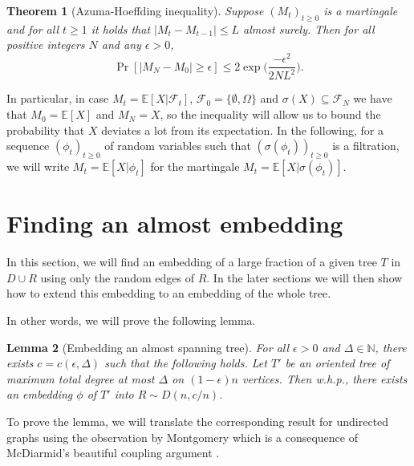 \documentclass[10pt, a4paper]{article}
\newtheorem{theorem}{Theorem}
\newtheorem{lemma}[theorem]{Lemma}
\theoremstyle{remark}
\newcommand*{\E}{\ensuremath{\mathbb{E}}}
\begin{document}
\vspace{10px}
\begin{theorem}[Azuma-Hoeffding inequality]\cite{azuma, hoeffding}\label{thm:azuma}
        Suppose $(M_t)_{t\geq 0}$ is a martingale and for all $t\geq 1$ it holds that $|M_t - M_{t-1}| \leq L$ almost surely.
        Then for all positive integers $N$ and any $\epsilon > 0$,
        \[ \Pr[|M_N - M_0| \geq \epsilon] \leq 2\exp \Bigg(\frac{-\epsilon^2}{2NL^2} \Bigg). \]
\end{theorem}

In particular, in case $M_t = \E[X | \mathcal{F}_t]$, $\mathcal{F}_0 = \{ \emptyset, \Omega \}$ and $\sigma(X) \subseteq \mathcal{F}_N$ we have that $M_0 = \E[X]$ and $M_N = X$, so the inequality will allow us to bound the probability that $X$ deviates a lot from its expectation.
In the following, for a sequence $(\phi_t)_{t\geq 0}$ of random variables such that $(\sigma(\phi_t))_{t\geq 0}$ is a filtration, we will write $M_t = \E[X | \phi_t]$ for the martingale $M_t = \E[X | \sigma(\phi_t)]$.

\section{Finding an almost embedding}\label{section:almostembedding}

In this section, we will find an embedding of a large fraction of a given tree $T$ in $D \cup R$ using only the random edges of $R$.
In the later sections we will then show how to extend this embedding to an embedding of the whole tree. 

In other words, we will prove the following lemma.

\begin{lemma}[Embedding an almost spanning tree]\label{lemma:almostembedding}
    For all $\epsilon >0$ and $\Delta \in \mathbb{N}$, there exists $c = c(\epsilon, \Delta)$ such that the following holds.
    Let $T'$ be an oriented tree of maximum total degree at most $\Delta$ on $(1-\epsilon)n$ vertices.
    Then w.h.p., there exists an embedding $\phi$ of $T'$ into $R \sim D(n, c/n)$.
\end{lemma}

To prove the lemma, we will translate the corresponding result for undirected graphs \cite[Theorem 1.1]{alon_embedding_2007} using the observation by Montgomery \cite[Theorem 3.1]{montgomery_spanning_2021} which is a consequence of McDiarmid's beautiful coupling argument \cite{mcdiarmid_general_1983}.
\end{document}
